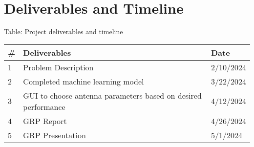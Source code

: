 \documentclass[12pt, letterpaper, notitlepage]{article}
\begin{document}
\section*{Deliverables and Timeline}
\begin{center}
\centering
Table: Project deliverables and timeline\\
\noindent\begin{tabular}{|l|l|l|} \hline
  \rowcolor{lightgray}\textbf{\#} & \textbf{Deliverables} & \textbf{Date} \\ \hline
  1 & Problem Description & 2/10/2024\\ \hline
  2 & Completed machine learning model & 3/22/2024\\ \hline
  3 & GUI to choose antenna parameters based on desired performance & 4/12/2024\\ \hline
  4 & GRP Report & 4/26/2024\\ \hline
  5 & GRP Presentation & 5/1/2024\\ \hline
\end{tabular}
\end{center}
\hspace{1em}



\end{document}
